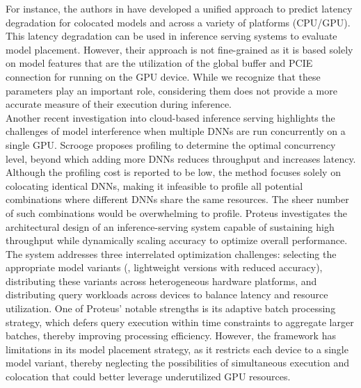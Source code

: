 For instance, the authors in have developed a unified approach to predict latency degradation for colocated models and across a variety of platforms (CPU/GPU). This latency degradation can be used in inference serving systems to evaluate model placement. However, their approach is not fine-grained as it is based solely on model features that are the utilization of the global buffer and PCIE connection for running on the GPU device. While we recognize that these parameters play an important role, considering them does not provide a more accurate measure of their execution during inference.\\
Another recent investigation into cloud-based inference serving highlights the challenges of model interference when multiple DNNs are run concurrently on a single GPU. Scrooge proposes profiling to determine the optimal concurrency level, beyond which adding more DNNs reduces throughput and increases latency. Although the profiling cost is reported to be low, the method focuses solely on colocating identical DNNs, making it infeasible to profile all potential combinations where different DNNs share the same resources. The sheer number of such combinations would be overwhelming to profile. Proteus investigates the architectural design of an inference-serving system capable of sustaining high throughput while dynamically scaling accuracy to optimize overall performance. The system addresses three interrelated optimization challenges: selecting the appropriate model variants (\eg, lightweight versions with reduced accuracy), distributing these variants across heterogeneous hardware platforms, and distributing query workloads across devices to balance latency and resource utilization. One of Proteus' notable strengths is its adaptive batch processing strategy, which defers query execution within time constraints to aggregate larger batches, thereby improving processing efficiency. However, the framework has limitations in its model placement strategy, as it restricts each device to a single model variant, thereby neglecting the possibilities of simultaneous execution and colocation that could better leverage underutilized GPU resources.

